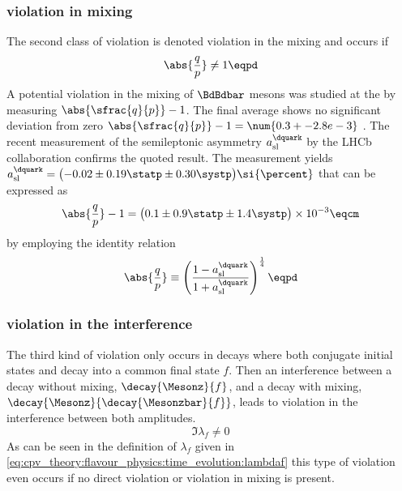 \subsubsection[\CP violation in mixing]{\CPbfsf violation in mixing}
\label{sec:cpv_theory:flavour_physics:cpv_classification:mixing}

The second class of \CP violation is denoted \CP violation in the mixing and
occurs if
%
\begin{equation}
  \abs{\frac{q}{p}} \neq 1 \eqpd
\end{equation}
%
A potential \CP violation in the mixing of $\BdBdbar$ mesons was studied at the
\BFactories by measuring $\abs{\sfrac{q}{p}} - 1$. The final \BFactory average
shows no significant deviation from zero $\abs{\sfrac{q}{p}} - 1 =
\num{0.3 +- 2.8 e-3}$ \cite{Bevan:2014iga}. The recent measurement of the
semileptonic \CP asymmetry $a_{\text{sl}}^{\dquark}$ by the \acs*{LHCb}
collaboration confirms the quoted result. The measurement yields
$a_{\text{sl}}^{\dquark} = \bigl(-0.02 \pm 0.19 \statp \pm 0.30 \systp \bigr)\si{\percent}$
\cite{Aaij:2014nxa} that can be expressed as
%
\begin{equation}
  \abs{\frac{q}{p}} - 1 = \bigl(0.1 \pm 0.9 \statp \pm 1.4 \systp \bigr) \times 10^{-3} \eqcm
\end{equation}
%
by employing the identity relation
%
\begin{equation}
  \abs{\frac{q}{p}} \equiv \left(\frac{1 - a_{\text{sl}}^{\dquark}}{1 + a_{\text{sl}}^{\dquark}}\right)^{\frac{1}{4}} \eqpd
\end{equation}
%

\subsubsection[\CP violation in the interference]{\CPbfsf violation in the interference}
\label{sec:cpv_theory:flavour_physics:cpv_classification:interference}

The third kind of \CP violation only occurs in decays where both \CP conjugate
initial states \Mesonz and \Mesonzbar decay into a common final state $f$. Then
an interference between a decay without mixing, $\decay{\Mesonz}{f}$, and a
decay with mixing, $\decay{\Mesonz}{\decay{\Mesonzbar}{f}}$, leads to \CP
violation in the interference between both amplitudes.
%
\begin{equation}
  \Im \lambda_f \neq 0   
\end{equation}
%
As can be seen in the definition of $\lambda_f$ given in
\cref{eq:cpv_theory:flavour_physics:time_evolution:lambdaf} this type of \CP
violation even occurs if no direct \CP violation or \CP violation in mixing is
present.
